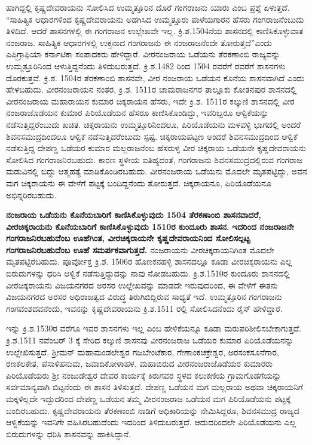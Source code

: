 ಹಾಗಿದ್ದಲ್ಲಿ ಕೃಷ್ಣದೇವರಾಯನು ಸೋಲಿಸಿದ ಉಮ್ಮತ್ತೂರಿನ ದೊರೆ ಗಂಗರಾಜನು ಯಾರು ಎಂಬ ಪ್ರಶ್ನೆ ಏಳುತ್ತದೆ. “ಸಾಹಿತ್ಯಿಕ ಆಧಾರಗಳಿಂದ ಕೃಷ್ಣದೇವರಾಯನು ಅಡಗಿಸಿದ ಉಮ್ಮತ್ತೂರು ಪಾಳೆಯಗಾರನ ಹೆಸರು ಗಂಗರಾಜನೆಂಬುದು ತಿಳಿದಿದೆ. ಆದರೆ ಶಾಸನಗಳಲ್ಲಿ ಈ ಗಂಗರಾಜನ ಉಲ್ಲೇಖವೇ ಇಲ್ಲ. ಕ್ರಿ.ಶ.1504ನೆಯ ಶಾಸನದಲ್ಲಿ ಕಾಣಿಸಿಕೊಳ್ಳುವಾತ ನಂಜರಾಜ. ಸಾಹಿತ್ಯಿಕ ಆಧಾರಗಳಲ್ಲಿ ಉಕ್ತನಾದ ಗಂಗರಾಜನು ಈ ನಂಜರಾಜನೆಂದೇ ತೋರುತ್ತದೆ”ಎಂದು ಎಪಿಗ್ರಾಫಿಯಾ ಕರ್ನಾಟಿಕಾ ಸಂಪಾದಕರು ಹೇಳಿದ್ದಾರೆ. ವೀರನಂಜರಾಯ ಒಡೆಯನು ತೆರಕಣಾಂಬಿ ರಾಜ್ಯವನ್ನು ಉಮ್ಮತ್ತೂರಿನಿಂದ ಆಳುತ್ತಿದ್ದನೆಂದು ತಿಳಿದುಬರುತ್ತದೆ. ಕ್ರಿ.ಶ.1482 ರಿಂದ 1504 ರವರೆಗೆ ರವರೆಗೆ ಶಾಸನಗಳು ದೊರಕುತ್ತವೆ. ಕ್ರಿ.ಶ. 1504ರ ತೆರಕಣಾಂಬಿ ಶಾಸನವೇ, ವೀರ ನಂಜರಾಯ ಒಡೆಯನ ಕೊನೆಯ ಶಾಸನವಾಗಿದೆ ಎಂದು ಹೇಳಬಹುದು. ವೀರನಂಜರಾಯನ ನಂತರ, ಕ್ರಿ.ಶ. 1511ರ ಚಾಮರಾಜನಗರ ತಾಲ್ಲೂಕು ಕೋತನಪುರ ಶಾಸನದಲ್ಲಿ ವೀರನಂಜರಾಯ ಮಹಾರಾಯನ ಕುಮಾರ ಚಿಕ್ಕರಾಯನ ಹೆಸರು, ಇದೇ ಕ್ರಿ.ಶ. 1511ರ ಕಲ್ಕುಣಿ ಶಾಸನದಲ್ಲಿ ವೀರ ನಂಜರಾಜೊಡೆಯನ ಕುಮಾರ ಪಿರಿಯೊಡೆಯನ ಹೆಸರೂ ಕಾಣಿಸಿಕೊಂಡಿದ್ದು, ಇವರಿಬ್ಬರೂ ಆಳ್ವಿಕೆಯನ್ನು ನಡೆಸುತ್ತಿದ್ದರೆಂಬುದು ಖಚಿತ. ಚಿಕ್ಕರಾಯನು ಉಮ್ಮತ್ತೂರಿನಿಂದಲೂ, ಪಿರಿಯೊಡೆಯನು ಮಳವಳ್ಳಿ ಭಾಗದಲ್ಲಿ ಅಂದರೆ ಶಿವನಸಮುದ್ರದಿಂದಲೂ ಆಳ್ವಿಕೆ ನಡೆಸುತ್ತಿದರೆಂಬುದು ಸ್ಪಷ್ಟ. ಚಿಕ್ಕರಾಯಪಟ್ಟಣ ಅಂದರೆ ಶಿವನಸಮುದ್ರದಿಂದ ಆಳ್ವಿಕೆ ನಡೆಸುತ್ತಿದ್ದ ದೇಪಣ್ಣ ಒಡೆಯರ ಕುಮಾರ ಮಲ್ಲರಾಜನೆಂಬ ಹೆಸರುಳ್ಳ ವೀರ ಚಿಕ್ಕರಾಯ ಒಡೆಯನೇ ಕೃಷ್ಣದೇವರಾಯನು ಸೋಲಿಸಿದ ಗಂಗರಾಜನಿರಬಹುದು. ಕಾರಣ ಸ್ಥಳೀಯ ಐತಿಹ್ಯದಂತೆ, ಗಂಗರಾಜನು ಶಿವನಸಮುದ್ರದಲ್ಲಿರುವ ಗಂಗರಾಜ ಮಡುವಿನಲ್ಲಿ ಬಿದ್ದು ಆತ್ಮಹತ್ಯೆ ಮಾಡಿಕೊಂಡಿರಬಹುದು. ವೀರನಂಜರಾಯ ಒಡೆಯನು ಮೊದಲೇ ಮೃತಪಟ್ಟಿದ್ದು, ಅವನ ಮಗ ಚಿಕ್ಕರಾಯನು ಈ ವೇಳೆಗೆ ಪಟ್ಟಕ್ಕೆ ಬಂದಿದ್ದನೆಂದು ತೋರುತ್ತದೆ. ಚಿಕ್ಕರಾಯನೂ, ಪಿರಿಯೊಡೆಯನೂ ಅಭಿನ್ನರಿರಬಹುದು. 

\textbf{ ನಂಜರಾಯ ಒಡೆಯನು ಕೊನೆಯಬಾರಿಗೆ ಕಾಣಿಸಿಕೊಳ್ಳುವುದು 1504 ತೆರಕಣಾಂಬಿ ಶಾಸನವಾದರೆ, ವೀರಚಿಕ್ಕರಾಯನು ಕೊನೆಯಬಾರಿಗೆ ಕಾಣಿಸಿಕೊಳ್ಳುವುದು 1510ರ ಕುಂದೂರು ಶಾಸನ.} \textbf{ಇದರಿಂದ ನಂಜರಾಜನೇ ಗಂಗರಾಜನಿರಬಹುದೆಂಬ ಊಹೆಗಿಂತ, ವೀರಚಿಕ್ಕರಾಯನೇ ಕೃಷ್ಣದೇವರಾಯನಿಂದ ಸೋಲಿಸಲ್ಪಟ್ಟ ಗಂಗರಾಜನಿರಬಹುದೆಂಬ ಊಹೆ ಸಮರ್ಪಕವಾಗುತ್ತದೆ.} ನಂಜರಾಯನು ವೀರಚಿಕ್ಕರಾಯನಿಗಿಂತ ಮೊದಲೇ ಮೃತಪಟ್ಟಿರಬಹುದು. ಪೂರ್ವೋಕ್ತ ಕ್ರಿ.ಶ. 1506ರ ಹೊಣಕನಹಳ್ಳಿ ಶಾಸನದಲ್ಲೂ ಕೂಡಾ ವೀರಚಿಕ್ಕರಾಯನು ಎಲ್ಲ ಬಿರುದುಗಳನ್ನು ಧರಿಸಿ ಆಳ್ವಿಕೆ ನಡೆಸುತ್ತಿದ್ದುದನ್ನು ನಾವು ನೋಡಬಹುದು. ಕ್ರಿ.ಶ.1510ರ ಕುಂದೂರು ಶಾಸನದಲ್ಲಿ ವೀರಚಿಕ್ಕರಾಯನು ವಿಜಯನಗರದ ಅರಸರ ಉಲ್ಲೇಖವನ್ನು ಮಾಡದೇ ಇರುವುದರಿಂದ, ಈ ವೇಳೆಗೆ ಈತನು ವಿಜಯನಗರದ ಅರಸರ ಅಧಿರಾಜತ್ವದ ವಿರುದ್ಧ ತಿರುಗಿಬಿದ್ದಿರುವ ಸಾಧ್ಯತೆ ಇದೆ. ಉಮ್ಮತ್ತೂರಿನ ಗಂಗರಾಜನು ಗಂಗವಂಶದವನೆಂದು, ಇವನನ್ನು ಕೃಷ್ಣದೇವರಾಯನು ಕ್ರಿ.ಶ.1511 ರಲ್ಲಿ ಸೋಲಿಸಿದನೆಂದು ರೈಸ್​ ಹೇಳಿದ್ದಾರೆ.

ಇನ್ನು ಕ್ರಿ.ಶ.1530ರ ವರೆಗೂ ಇವರ ಶಾಸನಗಳು ಇಲ್ಲ ಎಂಬ ಹೇಳಿಕೆಯನ್ನೂ ಕೂಡಾ ಮರುಪರಿಶೀಲಿಸಬೇಕಾಗುತ್ತದೆ. ಕ್ರಿ.ಶ.1511 ನವೆಂಬರ್​ 3 ಕ್ಕೆ ಸೇರಿದ ಕಲ್ಕುಣಿ ಶಾಸನವು ವೀರನಂಜರಾಜ ಒಡೆಯರ ಕುಮಾರ ಪಿರಿಯೊಡೆಯನನ್ನು ಉಲ್ಲೇಖಿಸುತ್ತದೆ. ಶ‍್ರೀಮನ್​ ಮಹಾಮಂಡಲೇಶ್ವರ ಗಜಬೇಂಟೆಕಾರ, ಗೇಣಾಂಕಚಕ್ರೇಶ್ವರ, ಅರಸಂಕಸೂನೆಗಾರ, ರಣಕಲಕೇತ, ಪೆಸಾಳಿಹನುಮ, ಜವಾದಿಕೋಳಾಹಳ, ಮಹಾಬಿರುದ ವೀರನಂಜರಾಜೊಡೆಯರ ಕುಮಾರರು ಪಿರಿಯೊಡೆಯರು ಶ‍್ರೀ ನಂಜುಡೇಶ್ವರ ದೇವರ ಕಾರ್ಯಕ್ಕೆ ಕಿರುಗವರ ಸ್ಥಳದ ಕಲುಕಣಿಯ ಗ್ರಾಮಗೊಡಗೆಯನ್ನು ಸರ್ವಮಾನ್ಯವಾಗಿ ಬಿಟ್ಟನೆಂದು ಈ ಶಾಸನ ತಿಳಿಸುತ್ತದೆ. ದೇಪಣ್ಣ ಒಡೆಯನ ಮಗ ಮಲ್ಲರಾಯ ಅಥವಾ ಚಿಕ್ಕರಾಯನಿಗೆ ಮಕ್ಕಳಿಲ್ಲದೇ ಇದ್ದುದರಿಂದ ದೇಪಣ್ಣ ಒಡೆಯನ ತಮ್ಮ ವೀರನಂಜರಾಜ ಒಡೆಯನ ಮಗ ಪಿರಿಯೊಡೆಯನು ಪಟ್ಟಕ್ಕೆ ಬಂದಿರಬಹುದು. ಕೃಷ್ಣದೇವರಾಯನು ತೆರಕಣಾಂಬಿ ನಾಡಿಗೆ ಅಧಿಕಾರಿಯನ್ನು ನೇಮಿಸಿದ್ದರೂ, ಶಿವನಸಮುದ್ರ ರಾಜ್ಯದ ಆಳ್ವಿಕೆಯನ್ನು ಇವನಿಗೇ ವಹಿಸಿರಬಹುದೆಂದು ಇದರಿಂದ ತಿಳಿದುಬರುತ್ತದೆ. ಆದುದರಿಂದಲೇ ಪಿರಿಯೊಡೆಯನು ಎಲ್ಲ ಬಿರುದುಗಳನ್ನು ಧರಿಸಿ ಶಾಸನವನ್ನು ಹಾಕಿಸಿದ್ದಾನೆ. 

